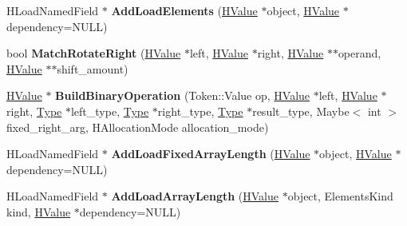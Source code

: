 \begin{DoxyCompactItemize}
\item 
\hypertarget{classv8_1_1internal_1_1_h_graph_builder_a5263be8a91458439fd1c27c3b83b74f1}{}H\+Load\+Named\+Field $\ast$ {\bfseries Add\+Load\+Elements} (\hyperlink{classv8_1_1internal_1_1_h_value}{H\+Value} $\ast$object, \hyperlink{classv8_1_1internal_1_1_h_value}{H\+Value} $\ast$dependency=N\+U\+L\+L)\label{classv8_1_1internal_1_1_h_graph_builder_a5263be8a91458439fd1c27c3b83b74f1}

\item 
\hypertarget{classv8_1_1internal_1_1_h_graph_builder_ae40e0a8433d23bb5d47bd2136357d590}{}bool {\bfseries Match\+Rotate\+Right} (\hyperlink{classv8_1_1internal_1_1_h_value}{H\+Value} $\ast$left, \hyperlink{classv8_1_1internal_1_1_h_value}{H\+Value} $\ast$right, \hyperlink{classv8_1_1internal_1_1_h_value}{H\+Value} $\ast$$\ast$operand, \hyperlink{classv8_1_1internal_1_1_h_value}{H\+Value} $\ast$$\ast$shift\+\_\+amount)\label{classv8_1_1internal_1_1_h_graph_builder_ae40e0a8433d23bb5d47bd2136357d590}

\item 
\hypertarget{classv8_1_1internal_1_1_h_graph_builder_a947f4bb0477092c2b3be3c7de2229d3a}{}\hyperlink{classv8_1_1internal_1_1_h_value}{H\+Value} $\ast$ {\bfseries Build\+Binary\+Operation} (Token\+::\+Value op, \hyperlink{classv8_1_1internal_1_1_h_value}{H\+Value} $\ast$left, \hyperlink{classv8_1_1internal_1_1_h_value}{H\+Value} $\ast$right, \hyperlink{classv8_1_1internal_1_1_type_impl}{Type} $\ast$left\+\_\+type, \hyperlink{classv8_1_1internal_1_1_type_impl}{Type} $\ast$right\+\_\+type, \hyperlink{classv8_1_1internal_1_1_type_impl}{Type} $\ast$result\+\_\+type, Maybe$<$ int $>$ fixed\+\_\+right\+\_\+arg, H\+Allocation\+Mode allocation\+\_\+mode)\label{classv8_1_1internal_1_1_h_graph_builder_a947f4bb0477092c2b3be3c7de2229d3a}

\item 
\hypertarget{classv8_1_1internal_1_1_h_graph_builder_a799a2cd15800045e3af54892e60959e3}{}H\+Load\+Named\+Field $\ast$ {\bfseries Add\+Load\+Fixed\+Array\+Length} (\hyperlink{classv8_1_1internal_1_1_h_value}{H\+Value} $\ast$object, \hyperlink{classv8_1_1internal_1_1_h_value}{H\+Value} $\ast$dependency=N\+U\+L\+L)\label{classv8_1_1internal_1_1_h_graph_builder_a799a2cd15800045e3af54892e60959e3}

\item 
\hypertarget{classv8_1_1internal_1_1_h_graph_builder_a97519307cdc5cfe24ec2446beff6183a}{}H\+Load\+Named\+Field $\ast$ {\bfseries Add\+Load\+Array\+Length} (\hyperlink{classv8_1_1internal_1_1_h_value}{H\+Value} $\ast$object, Elements\+Kind kind, \hyperlink{classv8_1_1internal_1_1_h_value}{H\+Value} $\ast$dependency=N\+U\+L\+L)\label{classv8_1_1internal_1_1_h_graph_builder_a97519307cdc5cfe24ec2446beff6183a}


\end{DoxyCompactItemize}
